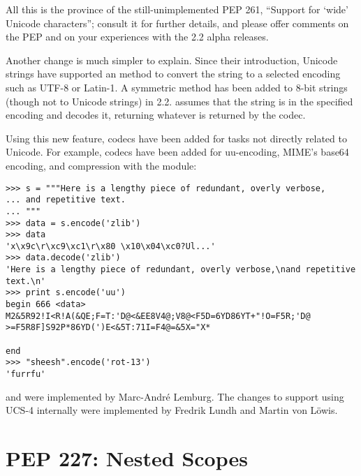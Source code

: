 \documentclass{howto}
\begin{document}
All this is the province of the still-unimplemented PEP 261, ``Support
for `wide' Unicode characters''; consult it for further details, and
please offer comments on the PEP and on your experiences with the
2.2 alpha releases.

Another change is much simpler to explain. Since their introduction,
Unicode strings have supported an  method to convert
the string to a selected encoding such as UTF-8 or Latin-1.  A
symmetric  method has been
added to 8-bit strings (though not to Unicode strings) in 2.2.
 assumes that the string is in the specified encoding
and decodes it, returning whatever is returned by the codec. 

Using this new feature, codecs have been added for tasks not directly
related to Unicode.  For example, codecs have been added for
uu-encoding, MIME's base64 encoding, and compression with the
 module:

\begin{verbatim}
>>> s = """Here is a lengthy piece of redundant, overly verbose,
... and repetitive text.
... """
>>> data = s.encode('zlib')
>>> data
'x\x9c\r\xc9\xc1\r\x80 \x10\x04\xc0?Ul...'
>>> data.decode('zlib')
'Here is a lengthy piece of redundant, overly verbose,\nand repetitive text.\n'
>>> print s.encode('uu')
begin 666 <data>
M2&5R92!I<R!A(&QE;F=T:'D@<&EE8V4@;V8@<F5D=6YD86YT+"!O=F5R;'D@
>=F5R8F]S92P*86YD(')E<&5T:71I=F4@=&5X="X*

end
>>> "sheesh".encode('rot-13')
'furrfu'
\end{verbatim}

 and  were implemented by
Marc-Andr\'e Lemburg.  The changes to support using UCS-4 internally
were implemented by Fredrik Lundh and Martin von L\"owis.

\begin{seealso}


\end{seealso}

\section{PEP 227: Nested Scopes}
\end{document}
